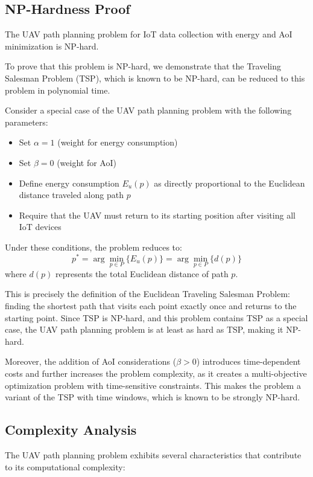 \documentclass[conference]{IEEEtran}
\begin{document}
\subsection{NP-Hardness Proof}
The UAV path planning problem for IoT data collection with energy and AoI minimization is NP-hard.

To prove that this problem is NP-hard, we demonstrate that the Traveling Salesman Problem (TSP), which is known to be NP-hard, can be reduced to this problem in polynomial time.

Consider a special case of the UAV path planning problem with the following parameters:
\begin{itemize}
    \item Set $\alpha = 1$ (weight for energy consumption)
    \item Set $\beta = 0$ (weight for AoI)
    \item Define energy consumption $E_u(p)$ as directly proportional to the Euclidean distance traveled along path $p$
    \item Require that the UAV must return to its starting position after visiting all IoT devices
\end{itemize}

Under these conditions, the problem reduces to:
\begin{equation}
    p^* = \arg\min_{p \in P} \{E_u(p)\} = \arg\min_{p \in P} \{d(p)\}
\end{equation}
where $d(p)$ represents the total Euclidean distance of path $p$.

This is precisely the definition of the Euclidean Traveling Salesman Problem: finding the shortest path that visits each point exactly once and returns to the starting point. Since TSP is NP-hard, and this problem contains TSP as a special case, the UAV path planning problem is at least as hard as TSP, making it NP-hard.

Moreover, the addition of AoI considerations ($\beta > 0$) introduces time-dependent costs and further increases the problem complexity, as it creates a multi-objective optimization problem with time-sensitive constraints. This makes the problem a variant of the TSP with time windows, which is known to be strongly NP-hard.

\subsection{Complexity Analysis}
The UAV path planning problem exhibits several characteristics that contribute to its computational complexity:
\end{document}
